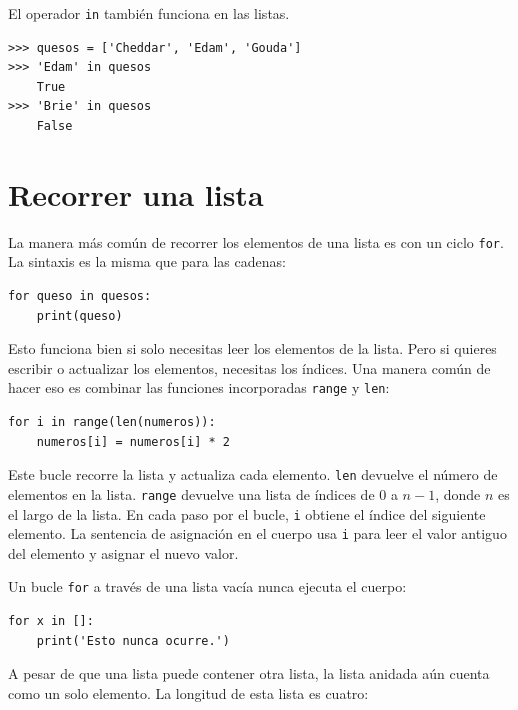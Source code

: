 \documentclass[10pt]{book}
\begin{document}

El operador {\tt in} también funciona en las listas.

\begin{verbatim}
>>> quesos = ['Cheddar', 'Edam', 'Gouda']
>>> 'Edam' in quesos
    True
>>> 'Brie' in quesos
    False
\end{verbatim}


\section{Recorrer una lista}

La manera más común de recorrer los elementos de una lista es
con un ciclo {\tt for}.  La sintaxis es la misma que para las cadenas:

\begin{verbatim}
for queso in quesos:
    print(queso)
\end{verbatim}
%
Esto funciona bien si solo necesitas leer los elementos de la
lista.  Pero si quieres escribir o actualizar los elementos,
necesitas los índices.  Una manera común de hacer eso es combinar
las funciones incorporadas {\tt range} y {\tt len}:

\begin{verbatim}
for i in range(len(numeros)):
    numeros[i] = numeros[i] * 2
\end{verbatim}
%
Este bucle recorre la lista y actualiza cada elemento.  {\tt len}
devuelve el número de elementos en la lista.  {\tt range} devuelve
una lista de índices de 0 a $n-1$, donde $n$ es el largo de
la lista.  En cada paso por el bucle, {\tt i} obtiene el índice
del siguiente elemento.  La sentencia de asignación en el cuerpo usa
{\tt i} para leer el valor antiguo del elemento y asignar el
nuevo valor.

Un bucle {\tt for} a través de una lista vacía nunca ejecuta el cuerpo:

\begin{verbatim}
for x in []:
    print('Esto nunca ocurre.')
\end{verbatim}
%
A pesar de que una lista puede contener otra lista, la lista
anidada aún cuenta como un solo elemento.  La longitud de esta lista es
cuatro:
\end{document}
